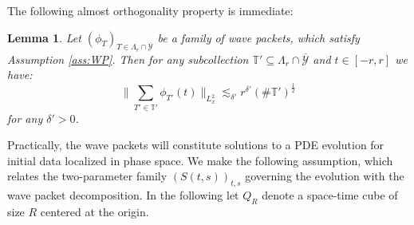 \documentclass{amsart}
\newtheorem{lemma}[theorem]{Lemma}
\theoremstyle{definition}
\newcommand{\T}{\mathbb{T}}
\begin{document}
The following almost orthogonality property is immediate:
\begin{lemma}
\label{lem:AlmostOrthogonalityWavePackets}
Let $(\phi_T)_{T \in \Lambda_r \cap \overline{\mathcal{Y}}}$ be a family of wave packets, which satisfy Assumption \ref{ass:WP}. Then for any subcollection $\T' \subseteq \Lambda_r \cap \overline{\mathcal{Y}}$ and $t \in [-r,r]$ we have:
\begin{equation*}
\big\| \sum_{T' \in \T'} \phi_{T'}(t) \big\|_{L_x^2} \lesssim_{\delta'} r^{\delta'} (\# \T')^{\frac{1}{2}}
\end{equation*}
for any $\delta' > 0$.
\end{lemma}

Practically, the wave packets will constitute solutions to a PDE evolution for initial data localized in phase space. 
We make the following assumption, which relates the two-parameter family $(S(t,s))_{t,s}$ governing the evolution with the wave packet decomposition. In the following let $Q_R$ denote a space-time cube of size $R$ centered at the origin.
\end{document}

